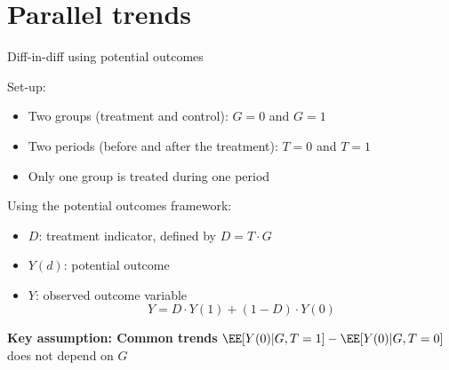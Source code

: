 \documentclass[compress, 8pt]{beamer}
\begin{document}
\section[Parallel trends]{Parallel trends}
\miniframesoff
\begin{frame}
    \tableofcontents[currentsection]
\end{frame}
\miniframeson

\begin{frame}{Diff-in-diff using potential outcomes}

Set-up:
\begin{itemize}
    \item Two groups (treatment and control): $G=0$ and $G=1$
    \item Two periods (before and after the treatment): $T=0$ and $T=1$
    \item Only one group is treated during one period
\end{itemize}

\vspace{2ex}
Using the potential outcomes framework:
\begin{itemize}
    \item $D$: treatment indicator, defined by $D = T \cdot G$
    \item $Y (d)$: potential outcome
    \item $Y$: observed outcome variable
    \begin{equation*}
        Y = D \cdot Y (1) + (1 - D) \cdot Y (0)
    \end{equation*}
\end{itemize}

\vspace{2ex}
\textbf{Key assumption: Common trends} $\EE [ Y(0) \vert G, T =1 ] - \EE [Y(0) \vert G, T= 0]$ does not depend on $G$



\end{frame}
\end{document}
